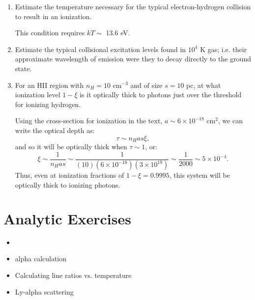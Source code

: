 \begin{enumerate} 
\item Estimate the temperature necessary for the typical
    electron-hydrogen collision to result in an
    ionization. 
    \begin{answer}
    This condition requires $kT \sim$ 13.6 eV. 
    \end{answer}

\item Estimate the typical collisional excitation levels found in
    $10^4$ K gas; i.e. their approximate wavelength of emission were
    they to decay directly to the ground state. 

\item For an HII region with $n_H = 10$ cm$^{-3}$ and of size $s=10$ pc,
    at what ionization level $1- \xi$ is it optically thick to photons
    just over the threshold for ionizing hydrogen.

    \begin{answer}
    Using the cross-section for ionization in the text, $a\sim 6\times
    10^{-18}$ cm$^2$, we can write the optical depth as:
       \begin{equation}
        \tau \sim n_H a s \xi,
       \end{equation}
    and so it will be optically thick when $\tau\sim 1$, or:
       \begin{equation}
        \xi \sim \frac{1}{n_H a s} \sim \frac{1}{(10) (6 \times
    10^{-18}) (3 \times 10^{19})} \sim \frac{1}{2000} \sim 5 \times
    10^{-4}.
       \end{equation}
    Thus, even at ionization fractions of $1- \xi=0.9995$, this system
    will be optically thick to ionizing photons.
    \end{answer}


\end{enumerate}   

\section{Analytic Exercises}

\begin{itemize}
\item {}
\item alpha calculation
\item Calculating line ratios vs. temperature
\item Ly-alpha scattering
\end{itemize}


